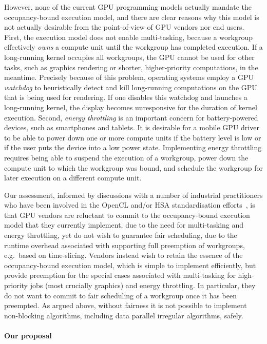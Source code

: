 \documentclass[nocopyrightspace]{sigplanconf-pldi16}
\begin{document}
However, none of the current GPU programming models actually mandate
the occupancy-bound execution model, and there are clear reasons why
this model is not actually desirable from the point-of-view of GPU
vendors nor end users.  First, the execution model does not enable
multi-tasking, because a workgroup effectively \emph{owns} a compute
unit until the workgroup has completed execution.  If a long-running
kernel occupies all workgroups, the GPU cannot be used for other
tasks, such as graphics rendering or shorter, higher-priority
computations, in the meantime.  Precisely because of this problem,
operating systems employ a GPU \emph{watchdog} to heuristically detect
and kill long-running computations on the GPU that is being used for
rendering.  If one disables this watchdog and launches a long-running
kernel, the display becomes unresponsive for the duration of kernel
execution.  Second, \emph{energy throttling} is an important concern
for battery-powered devices, such as smartphones and tablets.  It is
desirable for a mobile GPU driver to be able to power down one or more
compute units if the battery level is low or if the user puts the
device into a low power state.  Implementing energy throttling
requires being able to suspend the execution of a workgroup, power
down the compute unit to which the workgroup was bound, and schedule
the workgroup for later execution on a different compute unit.

Our assessment, informed by discussions with a number of industrial
practitioners who have been involved in the OpenCL and/or HSA
standardisation efforts~\cite{CitePersonalCommunication}, is that GPU
vendors are reluctant to commit to the occupancy-bound execution model
that they currently implement, due to the need for multi-tasking and
energy throttling, yet do not wish to guarantee fair scheduling, due
to the runtime overhead associated with supporting full preemption of
workgroups, e.g.\ based on time-slicing.  Vendors instead wish to
retain the essence of the occupancy-bound execution model, which is
simple to implement efficiently, but provide preemption for the special
cases associated with multi-tasking for high-priority jobs (most crucially
graphics) and energy throttling.  In particular, they do not want to
commit to fair scheduling of a workgroup once it has been preempted.
As argued above, without fairness it is not possible to implement
non-blocking algorithms, including data parallel irregular algorithms,
safely.

\paragraph{Our proposal}
\end{document}
